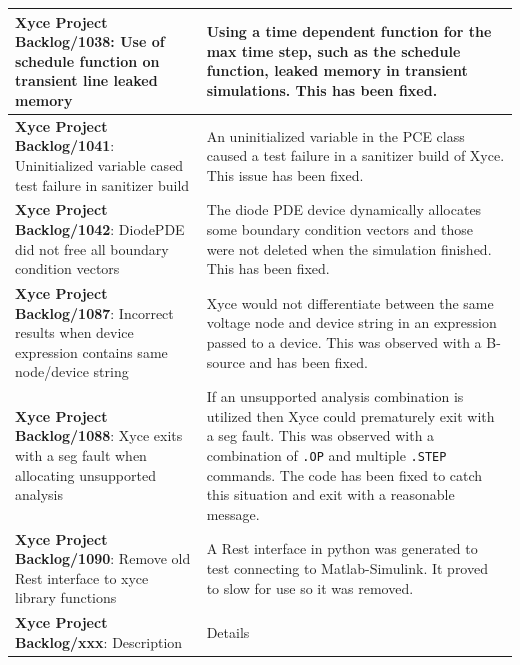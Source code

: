 {\begin{longtable}[h] {>{\raggedright\small}m{2in}|>{\raggedright\let\\\tabularnewline\small}m{3.5in}}
\textbf{Xyce Project Backlog/1038}: Use of schedule function on transient line leaked memory
  &  Using a time dependent function for the max time step, such as the schedule function,
  leaked memory in transient simulations.  This has been fixed.
  \\\hline

\textbf{Xyce Project Backlog/1041}: Uninitialized variable cased test failure in sanitizer build
  &  An uninitialized variable in the PCE class caused a test failure in a sanitizer build of Xyce.  
  This issue has been fixed.
  \\\hline
  
\textbf{Xyce Project Backlog/1042}: DiodePDE did not free all boundary condition vectors
  &  The diode PDE device dynamically allocates some boundary condition vectors and those
  were not deleted when the simulation finished.  This has been fixed.
  \\\hline

\textbf{Xyce Project Backlog/1087}: Incorrect results when device expression contains same node/device string
  &  Xyce would not differentiate between the same voltage node and device string in an expression passed to
     a device.  This was observed with a B-source and has been fixed.
  \\\hline

\textbf{Xyce Project Backlog/1088}: Xyce exits with a seg fault when allocating unsupported analysis
  &  If an unsupported analysis combination is utilized then Xyce could prematurely exit with a seg fault.
     This was observed with a combination of \texttt{.OP} and multiple \texttt{.STEP} commands.  The code
     has been fixed to catch this situation and exit with a reasonable message.
  \\\hline

\textbf{Xyce Project Backlog/1090}: Remove old Rest interface to xyce library functions
  &  A Rest interface in python was generated to test connecting to Matlab-Simulink.  It proved to slow for use 
  so it was removed.
  \\\hline


\textbf{Xyce Project Backlog/xxx}: Description
  &  Details
  \\\hline


\end{longtable}
}
